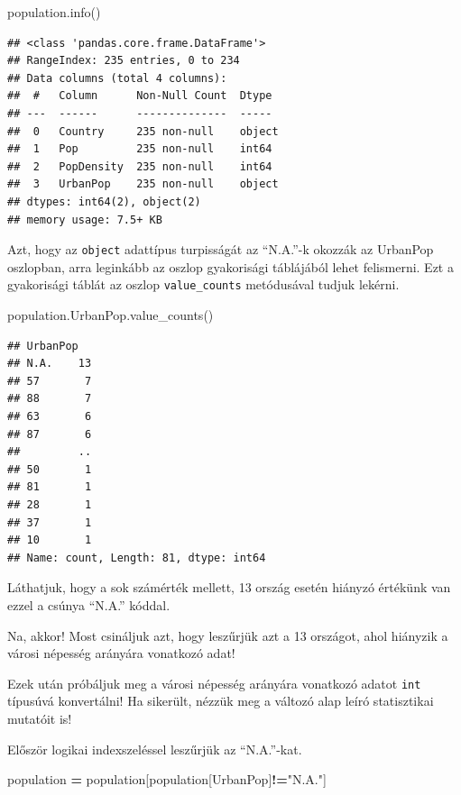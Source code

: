 \documentclass[
]{book}
\newenvironment{Shaded}{\begin{snugshade}}{\end{snugshade}}
\newcommand{\NormalTok}[1]{#1}
\newcommand{\OperatorTok}[1]{\textcolor[rgb]{0.81,0.36,0.00}{\textbf{#1}}}
\newcommand{\StringTok}[1]{\textcolor[rgb]{0.31,0.60,0.02}{#1}}
\begin{document}
\begin{Shaded}
\begin{Highlighting}[]
\NormalTok{population.info()}
\end{Highlighting}
\end{Shaded}

\begin{verbatim}
## <class 'pandas.core.frame.DataFrame'>
## RangeIndex: 235 entries, 0 to 234
## Data columns (total 4 columns):
##  #   Column      Non-Null Count  Dtype 
## ---  ------      --------------  ----- 
##  0   Country     235 non-null    object
##  1   Pop         235 non-null    int64 
##  2   PopDensity  235 non-null    int64 
##  3   UrbanPop    235 non-null    object
## dtypes: int64(2), object(2)
## memory usage: 7.5+ KB
\end{verbatim}

Azt, hogy az \texttt{object} adattípus turpisságát az ``N.A.''-k okozzák az UrbanPop oszlopban, arra leginkább az oszlop gyakorisági táblájából lehet felismerni. Ezt a gyakorisági táblát az oszlop \texttt{value\_counts} metódusával tudjuk lekérni.

\begin{Shaded}
\begin{Highlighting}[]
\NormalTok{population.UrbanPop.value\_counts()}
\end{Highlighting}
\end{Shaded}

\begin{verbatim}
## UrbanPop
## N.A.    13
## 57       7
## 88       7
## 63       6
## 87       6
##         ..
## 50       1
## 81       1
## 28       1
## 37       1
## 10       1
## Name: count, Length: 81, dtype: int64
\end{verbatim}

Láthatjuk, hogy a sok számérték mellett, 13 ország esetén hiányzó értékünk van ezzel a csúnya ``N.A.'' kóddal.

Na, akkor! Most csináljuk azt, hogy leszűrjük azt a 13 országot, ahol hiányzik a városi népesség arányára vonatkozó adat!

Ezek után próbáljuk meg a városi népesség arányára vonatkozó adatot \texttt{int} típusúvá konvertálni! Ha sikerült, nézzük meg a változó alap leíró statisztikai mutatóit is!

Először logikai indexszeléssel leszűrjük az ``N.A.''-kat.

\begin{Shaded}
\begin{Highlighting}[]
\NormalTok{population }\OperatorTok{=}\NormalTok{ population[population[}\StringTok{\textquotesingle{}UrbanPop\textquotesingle{}}\NormalTok{]}\OperatorTok{!=}\StringTok{"N.A."}\NormalTok{]}
\end{Highlighting}
\end{Shaded}
\end{document}
